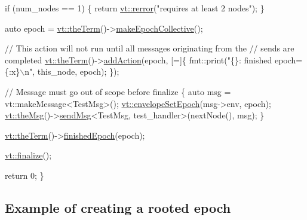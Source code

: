\begin{DoxyCodeInclude}
  \textcolor{keywordflow}{if} (num\_nodes == 1) \{
    \textcolor{keywordflow}{return} \hyperlink{namespacevt_aff96ace008dc847d4c0f44cfa5dfb3a0}{vt::rerror}(\textcolor{stringliteral}{"requires at least 2 nodes"});
  \}

  \textcolor{keyword}{auto} epoch = \hyperlink{namespacevt_a127580fdfcaba0b4171e5c48c5676733}{vt::theTerm}()->\hyperlink{structvt_1_1term_1_1_termination_detector_a748dfa37925107b37bde702e6c5f4aa4}{makeEpochCollective}();

  \textcolor{comment}{// This action will not run until all messages originating from the}
  \textcolor{comment}{// sends are completed}
  \hyperlink{namespacevt_a127580fdfcaba0b4171e5c48c5676733}{vt::theTerm}()->\hyperlink{structvt_1_1term_1_1_term_action_a1227042cb4eb38937fb8ed34bcbdf998}{addAction}(epoch, [=]\{
    fmt::print(\textcolor{stringliteral}{"\{\}: finished epoch=\{:x\}\(\backslash\)n"}, this\_node, epoch);
  \});

  \textcolor{comment}{// Message must go out of scope before finalize}
  \{
    \textcolor{keyword}{auto} msg = vt::makeMessage<TestMsg>();
    \hyperlink{namespacevt_a4a0a9928690206b588dbcac2afb71088}{vt::envelopeSetEpoch}(msg->env, epoch);
    \hyperlink{namespacevt_aeafd31f866aeb4dc6fc2f6ee97136350}{vt::theMsg}()->\hyperlink{group__preregister_ga0162a39473e7f9b490a79a7983d949ac}{sendMsg}<TestMsg, test\_handler>(nextNode(), msg);
  \}

  \hyperlink{namespacevt_a127580fdfcaba0b4171e5c48c5676733}{vt::theTerm}()->\hyperlink{structvt_1_1term_1_1_termination_detector_ad54d75c50bd3f34f30247817737bc303}{finishedEpoch}(epoch);

  \hyperlink{namespacevt_a540d90dbd6e97b69f1dcbc9ee9314cff}{vt::finalize}();

  \textcolor{keywordflow}{return} 0;
\}
\end{DoxyCodeInclude}
 \hypertarget{term_term-rooted-example}{}\subsection{Example of creating a rooted epoch}\label{term_term-rooted-example}

